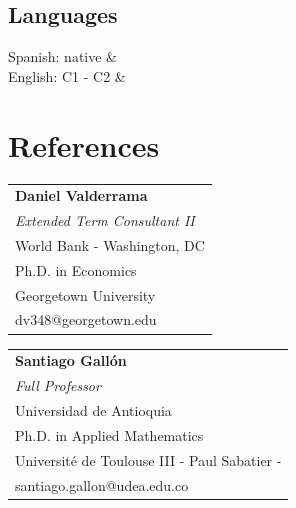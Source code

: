 \documentclass[a3paper,11pt]{article}
\begin{document}
\begin{adjustbox}{valign=t}
\begin{minipage}{0.6\textwidth}
\begin{multicols}{2}
\section*{Languages}
\begin{tblr}{
}
	Spanish: native & \\
	English: C1 - C2 &  \\
\end{tblr}
\end{multicols}
\section*{References}

\begin{multicols}{2}

\raggedright
\begin{tabular}{l}
\textbf{Daniel Valderrama}  \\
\textit{Extended Term Consultant II} \\
World Bank - Washington, DC\\
Ph.D. in Economics \\
Georgetown University\\
dv348@georgetown.edu

\end{tabular}

\vfill\null \columnbreak  %

\begin{tabular}{l}
\textbf{Santiago Gallón} \\
\textit{Full Professor} \\
Universidad de Antioquia\\
Ph.D. in Applied Mathematics \\
Université de Toulouse III - Paul Sabatier -\\
santiago.gallon@udea.edu.co
\end{tabular}
\end{multicols}
\LastUpdate
\end{minipage}
\end{adjustbox}
\end{document}
